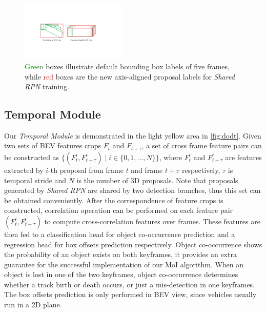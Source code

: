 \documentclass[letterpaper, 10pt, conference]{ieeeconf}  %
\begin{document}
\begin{figure}
	\vspace{0.05cm}
	\begin{center}
		\includegraphics[trim={5.5cm, 6cm, 9cm, 6.5cm}, clip, width=0.45\textwidth]{images/axis-aligned-boxes.pdf}
	\end{center}
	\caption{\textcolor{green}{Green} boxes illustrate default bounding box labels of five frames, while \textcolor{red}{red} boxes are the new axis-aligned proposal labels for \textit{Shared RPN} training.}
	\label{fig:integrated_boxes}
	\vspace{-0.6cm}
\end{figure}

\subsection{Temporal Module}
Our \textit{Temporal Module} is demonstrated in the light yellow area in \figurename \ref{fig:dodt}. Given two sets of BEV features crops $F_t$ and $F_{t+\tau}$, a set of cross frame feature pairs can be constructed as $\{(F_t^i, F_{t+\tau}^i)\mid i \in \{0,1,...,N\}\}$, where $F_t^i$ and $F_{t+\tau}^i$ are features extracted by $i$-th proposal from frame $t$ and frame $t+\tau$ respectively, $\tau$ is temporal stride and $N$ is the number of 3D proposals. Note that proposals generated by \textit{Shared RPN} are shared by two detection branches, thus this set can be obtained conveniently. After the correspondence of feature crops is constructed, correlation operation can be performed on each feature pair $(F_t^i, F_{t+\tau}^i)$ to compute cross-correlation features over frames. These features are then fed to a classification head for object co-occurrence prediction and a regression head for box offsets prediction respectively. Object co-occurrence shows the probability of an object exists on both keyframes, it provides an extra guarantee for the successful implementation of our MoI algorithm. When an object is lost in one of the two keyframes, object co-occurrence determines whether a track birth or death occurs, or just a mis-detection in one keyframes. The box offsets prediction is only performed in BEV view, since vehicles usually run in a 2D plane.
\end{document}
